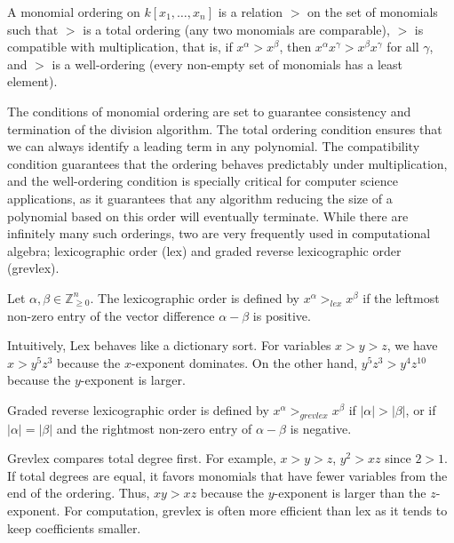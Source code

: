 \begin{definition}
\label{def:monomial_ordering}
A monomial ordering on $k[x_1, \dots, x_n]$ is a relation $>$ on the set of monomials such that $>$ is a total ordering (any two monomials are comparable), $>$ is compatible with multiplication, that is, if $x^\alpha > x^\beta$, then $x^\alpha x^\gamma > x^\beta x^\gamma$ for all $\gamma$, and $>$ is a well-ordering (every non-empty set of monomials has a least element).
\end{definition}

The conditions of monomial ordering are set to guarantee consistency and termination of the division algorithm. The total ordering condition ensures that we can always identify a leading term in any polynomial. The compatibility condition guarantees that the ordering behaves predictably under multiplication, and the well-ordering condition is specially critical for computer science applications, as it guarantees that any algorithm reducing the size of a polynomial based on this order will eventually terminate. While there are infinitely many such orderings, two are very frequently used in computational algebra; lexicographic order (lex) and graded reverse lexicographic order (grevlex).

\begin{definition}
\label{def:lex_order}
Let $\alpha, \beta \in \mathbb{Z}_{\ge 0}^n$. The lexicographic order is defined by  $x^\alpha >_{lex} x^\beta$ if the leftmost non-zero entry of the vector difference $\alpha - \beta$ is positive.
\end{definition}
Intuitively, Lex behaves like a dictionary sort. For variables $x > y > z$, we have $x > y^5 z^3$ because the $x$-exponent dominates. On the other hand, $y^5 z^3 > y^4 z^{10}$ because the $y$-exponent is larger.

\begin{definition}
\label{def:grevlex_order}
Graded reverse lexicographic order is defined by $x^\alpha >_{grevlex} x^\beta$ if $|\alpha| > |\beta|$, or if $|\alpha| = |\beta|$ and the rightmost non-zero entry of $\alpha - \beta$ is negative.
\end{definition}
Grevlex compares total degree first. For example, $x>y>z$, $y^2 > x z$ since $2 > 1$. If total degrees are equal, it favors monomials that have fewer variables from the end of the ordering. Thus, $x y > x z$ because the $y$-exponent is larger than the $z$-exponent. For computation, grevlex is often more efficient than lex as it tends to keep coefficients smaller.


